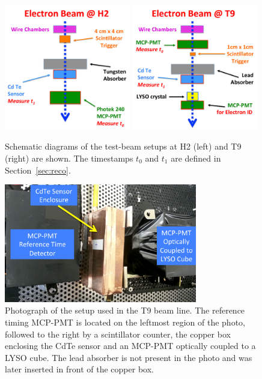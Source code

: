 \begin{figure}[htbp] 
\centering
\includegraphics[width=0.49\textwidth]{figures/H2_BeamSchematicDiagram.pdf} 
\includegraphics[width=0.49\textwidth]{figures/T9_BeamSchematicDiagram.pdf} 
\caption{Schematic diagrams of the test-beam setups at H2 (left) and T9 (right) are shown. 
The timestamps $t_0$ and $t_1$ are defined in Section~\ref{sec:reco}.} 
\label{fig:BeamSchematicDiagram} 
\end{figure} 

\begin{figure}[htbp] 
\centering
\includegraphics[width=0.75\textwidth]{figures/T9SetupPhoto.pdf} 
\caption{ Photograph of the setup used in the T9 beam line. The reference timing MCP-PMT 
is located on the leftmost region of the photo, followed to the right by a scintillator counter, 
the copper box enclosing the CdTe sensor and an MCP-PMT optically coupled to a LYSO cube. 
The lead absorber is not present in the photo and was later inserted in front of the copper box.} 
\label{fig:SetupPhoto} 
\end{figure} 


